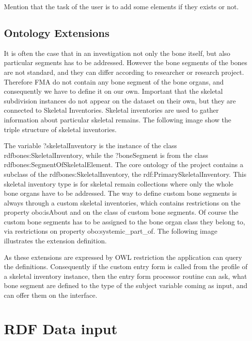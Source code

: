 Mention that the task of the user is to add some elements if they exists or not.


\subsection{Ontology Extensions}

It is often the case that in an investigation not only the bone itself, but also particular segments has to be addressed. However the bone segments of the bones are not standard, and they can differ according to researcher or research project. Therefore FMA do not contain any bone segment of the bone organs, and consequently we have to define it on our own. 
Important that the skeletal subdivision instances do not appear on the dataset on their own, but they are connected to Skeletal Inventories. Skeletal inventories are used to gather information about particular skeletal remains.  The following image show the triple structure of skeletal inventories.


The variable ?skeletalInventory is the instance of the class rdfbones:SkeletalInventory, while the ?boneSegment is from the class rdfbones:SegmentOfSkeletalElement. The core ontology of the project contains a subclass of the rdfbones:SkeletalInventory, the rdf:PrimarySkeletalInventory. This skeletal inventory type is for skeletal remain collections where only the whole bone organs have to be addressed.  The way to define custom bone segments is always through a custom skeletal inventories, which contains restrictions on the property obo:isAbout and on the class of custom bone segments. Of course the custom bone segments has to be assigned to the bone organ class they belong to, via restrictions on property obo:systemic\_part\_of. The following image illustrates the extension definition.



As these extensions are expressed by OWL restriction the application can query the definitions. Consequently if the custom entry form is called from the profile of a skeletal inventory instance, then the entry form processor routine can ask, what bone segment are defined to the type of the subject variable coming as input, and can offer them on the interface.



\section{RDF Data input}

